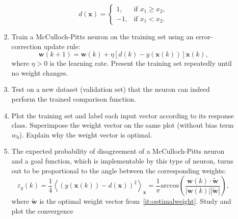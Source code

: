 \documentclass[12pt, a4]{article}
\begin{document}
\begin{enumerate}
\begin{enumerate}
                \begin{equation*}
                    d(\mathbf{x})=
                    \begin{cases}
                        1, & \text{if } x_1\geq x_2, \\
                        -1, & \text{if } x_1<x_2.
                    \end{cases}
                \end{equation*}
            \item Train a McCulloch-Pitts neuron on the training set
                using an error-correction update rule:
                \begin{equation}
                    \textbf{w}(k+1)=\mathbf{w}(k)+\eta
                    [d(k)-y(\mathbf{x}(k))]\mathbf{x}(k),
                    \label{eq:errorupdate}
                \end{equation}
                where $\eta>0$ is the learning rate.
                Present the training set repeatedly until no weight
                changes.
            \item Test on a new dataset (validation set) that the
                neuron can indeed perform the trained comparison function.
            \item\label{it:optimalweight} Plot the training set and label each
                input vector according to its response class. Superimpose the
                weight vector on the same plot (without bias term $w_0$).
                Explain why the weight vector is optimal.
            \item \label{it:gen_error} The expected probability of disagreement of a
                McCulloch-Pitts neuron and a goal function, which is
                implementable by this type of neuron, turns out to be
                proportional to the angle between the corresponding weights:
                \begin{equation}
                    \varepsilon_g(k) = \frac{1}{4} \left<
                    \left( y\left(\mathbf{x}\left(k\right)\right) -
                    d\left(\mathbf{x}\right) \right)^2 \right>_\mathbf{x} =
                    \frac{1}{\pi} \mathrm{arccos} \left( \frac{\mathbf{w}(k)
                    \cdot \mathbf{\tilde w}}{|\mathbf{w}(k)| |\mathbf{\tilde
                    w}|} \right),
                    \label{eq:generalizationerr}
                \end{equation}
                where $\mathbf{\tilde w}$ is the optimal weight vector
                from~\ref{it:optimalweight}. Study and plot the convergence

\end{enumerate}
\end{enumerate}
\end{document}
